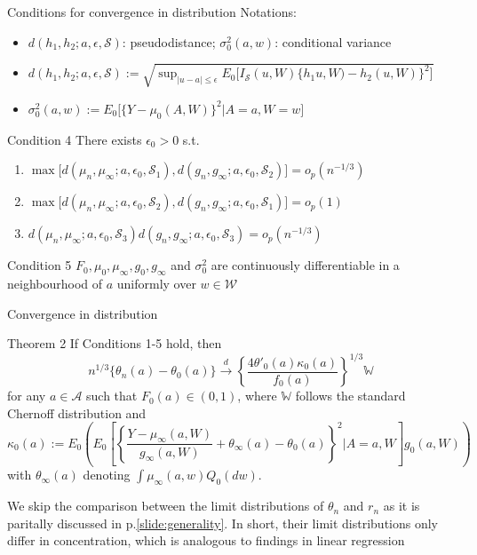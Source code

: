 \documentclass{beamer}
\newcommand{\f}[2]{\frac{#1}{#2}}
\begin{document}
\begin{frame}{Conditions for convergence in distribution}
  Notations:
  \begin{itemize}
    \item $d(h_1,h_2; a,\epsilon,\mathcal{S})$: pseudodistance; $\sigma_0^2(a,w)$: conditional variance
    \item $d(h_1,h_2; a,\epsilon,\mathcal{S}) := \scriptstyle \sqrt{\sup_{|u-a| \le \epsilon} E_0 \big[ I_\mathcal{S}(u,W) \{ h_1 u,W) -h_2(u,W) \}^2 \big]}$
    \item $\sigma_0^2(a,w) := E_0 \big[ \{Y -\mu_0(A,W)\}^2 | A=a, W=w \big]$
  \end{itemize}
  \begin{block}{Condition 4}
    There exists $\epsilon_0 > 0$ s.t.
    \begin{enumerate}
      \item $\max \big[ d(\mu_n,\mu_\infty; a,\epsilon_0,\mathcal{S}_1), d(g_n,g_\infty; a,\epsilon_0,\mathcal{S}_2) \big] = o_p(n^{-1/3})$
      \item $\max \big[ d(\mu_n,\mu_\infty; a,\epsilon_0,\mathcal{S}_2), d(g_n,g_\infty; a,\epsilon_0,\mathcal{S}_1) \big] = o_p(1)$
      \item $d(\mu_n,\mu_\infty; a,\epsilon_0,\mathcal{S}_3) d(g_n,g_\infty; a,\epsilon_0,\mathcal{S}_3) = o_p(n^{-1/3})$
    \end{enumerate}
  \end{block}
  \begin{block}{Condition 5}
    $F_0, \mu_0, \mu_\infty, g_0, g_\infty$ and $\sigma_0^2$ are continuously differentiable in a neighbourhood of $a$ uniformly over $w \in \mathcal{W}$
  \end{block}
\end{frame}

\begin{frame}{Convergence in distribution}
  \begin{block}{Theorem 2}
    If Conditions 1-5 hold, then
    $$
      n^{1/3} \{ \theta_n(a) -\theta_0(a) \} \stackrel{d}{\rightarrow} \left\{ \f{4 \theta'_0(a) \kappa_0(a)}{f_0(a)} \right\}^{1/3} \mathbb{W}
    $$
    for any $a \in \mathcal{A}$ such that $F_0(a) \in (0,1)$, where $\mathbb{W}$ follows the standard Chernoff distribution and
    $$
      \kappa_0(a) := \scriptstyle E_0 \left( E_0\left[ \left\{ \f{Y-\mu_\infty(a,W)}{g_\infty(a,W)} +\theta_\infty(a) -\theta_0(a) \right\}^2 \Big| A=a,W \right] g_0(a,W) \right)
    $$
    with $\theta_\infty(a)$ denoting $\int \mu_\infty(a,w) Q_0(dw)$.
  \end{block}
  We skip the comparison between the limit distributions of $\theta_n$ and $r_n$ as it is paritally discussed in p.\ref{slide:generality}. In short, their limit distributions only differ in concentration, which is analogous to findings in linear regression
\end{frame}
\end{document}
